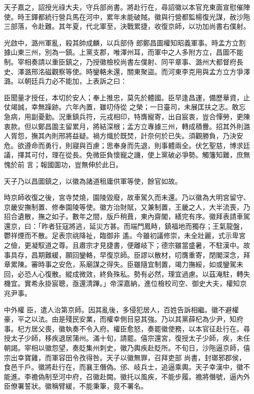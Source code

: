 \begin{pinyinscope}
 天子嘉之，詔授光祿大夫，守兵部尚書。將赴行在，尋詔徽以本官充東面宣慰催陣使。時王鐸都統行營兵馬在河中，累年未能破賊。徽與行營都監楊復光謀，赦沙陁三部落，令赴難。其年夏，代北軍至，決戰累捷，收復京師，以功加尚書右僕射。



 光啟中，潞州軍亂，殺其帥成麟，以兵部侍
 郎鄭昌圖權知昭義軍事。時孟方立割據山東三州，別為一鎮。上黨支郡，唯澤州耳，而軍中之人多附方立，昌圖不能制。宰相奏請以重臣鎮之，乃授徽檢校尚書左僕射、同平章事、潞州大都督府長史、澤潞邢洺磁觀察等使。時鑾輅未還，關東聚盜。而河東李克用與孟方立方爭澤潞。以朝廷兵力必不能加，上表訴之曰：



 臣聞量才授任，本切於安人；奉上推忠，莫先於體國。臣早逢昌運，備歷華資，止仗竭誠，幸無躁跡。六年內置，雖叨侍從
 之榮；一日臺司，未展匡扶之志。敢忘急病，用副憂勤。況重鎮兵符，元戎相印，特膺寵寄，出自宸衷，豈合憚勞，更陳衷款。但以鄭昌圖主留累月，將結深根；孟方立專據三州，轉成積釁。招其外則潞人胥怨，撫其內則邢將益疑。禍方熾於既焚，計奈何於已失。須觀勝負，乃決安危。欲遵命而勇行，則寢與百慮；思奉身而先退，則事體兩全。伏乞聖慈，博求廷議，擇其可付，理在從長。免微臣負懷寵之譏，使上黨破必爭勢。觸籓知難，庶無愧於前
 言；報國圖功，豈無伸於此日。



 天子乃以昌圖鎮之，以徽為諸道租庸供軍等使，餘官如故。



 時京師收復之後，宮寺焚燒，園陵毀廢，故車駕久而未還。乃以徽為大明宮留守、京畿安撫制置、修奉園陵等使。徽方治財賦，又兼制置，王畿之人，大半流喪，乃招合遺散，撫之如子。數年之間，版戶稍葺，東內齋閣，繕完有序。徽拜表請車駕還京，曰：「昨者狂寇將逃，延災方甚。而端門鳳畤，鎮福地而獨存；王氣龍盤，鬱祥煙而不散。足表宗祧降祉，臨御非
 遙。今雖初議修崇，未全壯麗，式示卑宮之儉，更凝馭道之尊。且肅宗才見捷書，便離岐下；德宗雖當盛暑，不駐漢中。故事具存，昌期難緩，願回鑾輅，早復京師。臣謬以散材，叨膺重寄，閉閣深念，拜章累陳。審時事之安危，系廟謀之得失。臣雖隨宜制置，竭力撫綏，如或鑾駕未回，必恐人心復散。縱成微效，終負殊私。勢有必然，理宜過慮。以茲淹駐，轉失機宜。實希永掛宸聰，亟還清蹕。」帝深嘉納，進位檢校司空、御史大夫，權知京兆尹事。



 中外權
 臣，遣人治第京師。因其亂後，多侵犯居人，百姓告訴相繼。徽不避權豪，平之以法。由是殘民安業，而權幸側目惡其強。乃以其黨薛杞為少尹，知府事。杞方居父喪，徽執奏不令入府。權臣愈怒，奏罷徽使務，以本官征赴行在。尋授太子少師，移疾退居蒲州。滿十旬，請罷。僖宗還宮，復授太子少師，疾，未任朝謁。宰相以徽怨望，奏貶集州刺史，徽乃輿疾赴貶所。不旬日，沙陁逼京師，僖宗出幸寶雞，而軍容田令孜得咎。天子以徽無罪，召拜吏部
 尚書，封瑯邪郡侯，食邑千戶。徽將赴行在，而襄王僭偽。邠、岐兵士，追逼乘輿。天子幸漢中，徽不能進。李襜偽制至河中府，召徽赴闕。徽托以風疾，不能步履。襜將僭號，逼內外臣僚署誓狀。徽稱臂緩，不能秉筆，竟不署名。




\end{pinyinscope}
